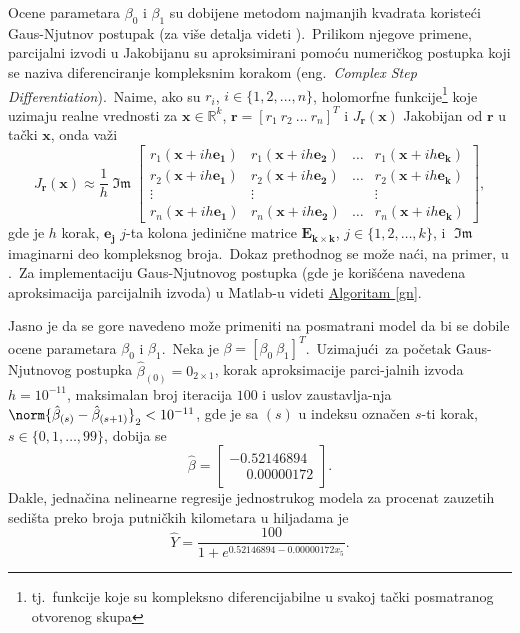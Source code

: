 \documentclass[12pt,a4paper,titlepage,oneside]{article}
\numberwithin{equation}{section}
\numberwithin{figure}{section}
\numberwithin{table}{section}
\theoremstyle{definition}
\theoremstyle{remark}
\begin{document}
Ocene parametara $\beta_0$ i $\beta_1$ su dobijene metodom najmanjih kvadrata koristeći Gaus-Njutnov postupak (za više detalja videti \cite{urlFl}).\ Prilikom njegove primene, parcijalni izvodi u Jakobijanu su aproksimirani pomoću numeričkog postupka koji se naziva diferenciranje kompleksnim korakom (eng.\ \textit{Complex Step Differentiation}).\ Naime, ako su $r_i$, $i\in\lbrace 1, 2, \dots , n\rbrace$, holomorfne funkcije\footnote{tj.\ funkcije koje su kompleksno diferencijabilne u svakoj tački posmatranog otvorenog skupa} koje uzimaju realne vrednosti za $\bm{x}\in\mathbb{R}^k$, $\bm{r} = [r_1~r_2~\dots ~r_n]^T$ i $J_{\bm{r}}(\bm{x})$ Jakobijan od $\bm{r}$ u tački $\bm{x}$, onda važi
\[
J_{\bm{r}}(\bm{x})
\approx \frac{1}{h}\mathop{\mathfrak{Im}}
\begin{bmatrix}
	r_1(\bm{x} + ih\bm{e_1}) & r_1(\bm{x} + ih\bm{e_2}) & \dots  & r_1(\bm{x} + ih\bm{e_k}) \\
	r_2(\bm{x} + ih\bm{e_1}) & r_2(\bm{x} + ih\bm{e_2}) & \dots  & r_2(\bm{x} + ih\bm{e_k}) \\
	\vdots & \vdots &  & \vdots \\
	r_n(\bm{x} + ih\bm{e_1}) & r_n(\bm{x} + ih\bm{e_2}) & \dots  & r_n(\bm{x} + ih\bm{e_k})
\end{bmatrix}
,
\]
gde je $h$ korak, $\bm{e_j}$ $j$-ta kolona jedinične matrice $\bm{E_{k\times k}}$, $j\in\lbrace 1, 2, \dots , k\rbrace$, i $\mathop{\mathfrak{Im}}$ imaginarni deo kompleksnog broja.\ Dokaz prethodnog se može naći, na primer, u \cite{LaC}.\ Za implementaciju Gaus-Njutnovog postupka (gde je korišćena navedena aproksimacija parcijalnih izvoda) u Matlab-u videti \hyperref[gn]{Algoritam \ref*{gn}}.

Jasno je da se gore navedeno može primeniti na posmatrani model da bi se dobile ocene parametara $\beta_0$ i $\beta_1$.\ Neka je $\beta = [\beta_0 ~\beta_1]^T$.\ Uzimajući~za početak Gaus-Njutnovog postupka $\hat{\beta}_{(0)} = 0_{2\times 1}$, korak aproksimacije parci-jalnih izvoda $h = 10^{-11}$, maksimalan broj iteracija $100$ i uslov zaustavlja-nja $\norm{\hat{\beta}_{(s)} - \hat{\beta}_{(s + 1)}}_2 < 10^{-11}$, gde je sa $(s)$ u indeksu označen $s$-ti korak, $s\in\lbrace 0, 1, \dots , 99\rbrace$, dobija se
\[
\hat{\beta} =
\begin{bmatrix}
	-0.52146894\\
	\mathbin{\phantom{+}}0.00000172
\end{bmatrix}
.
\]
Dakle, jednačina nelinearne regresije jednostrukog modela za procenat zauzetih sedišta preko broja putničkih kilometara u hiljadama je \[\hat{Y} = \dfrac{100}{1 + e^{0.52146894 - 0.00000172 x_5}}.\]
\end{document}
